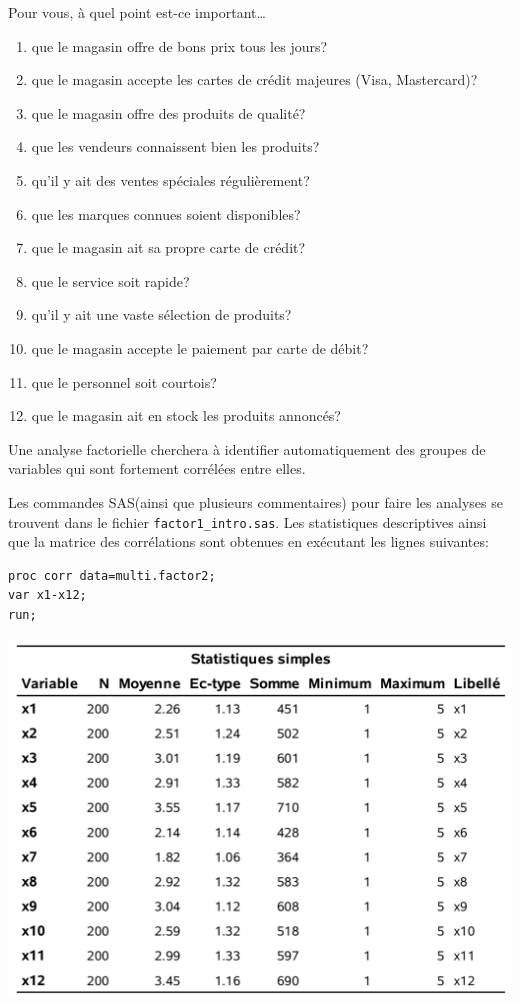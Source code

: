 \documentclass[
]{book}
\providecommand{\tightlist}{%
  \setlength{\itemsep}{0pt}\setlength{\parskip}{0pt}}
\theoremstyle{definition}
\theoremstyle{definition}
\theoremstyle{definition}
\theoremstyle{remark}
\begin{document}
Pour vous, à quel point est-ce important\ldots

\begin{enumerate}
\def\labelenumi{\arabic{enumi}.}
\tightlist
\item
  que le magasin offre de bons prix tous les jours?
\item
  que le magasin accepte les cartes de crédit majeures (Visa, Mastercard)?
\item
  que le magasin offre des produits de qualité?
\item
  que les vendeurs connaissent bien les produits?
\item
  qu'il y ait des ventes spéciales régulièrement?
\item
  que les marques connues soient disponibles?
\item
  que le magasin ait sa propre carte de crédit?
\item
  que le service soit rapide?
\item
  qu'il y ait une vaste sélection de produits?
\item
  que le magasin accepte le paiement par carte de débit?
\item
  que le personnel soit courtois?
\item
  que le magasin ait en stock les produits annoncés?
\end{enumerate}

Une analyse factorielle cherchera à identifier automatiquement des groupes de variables qui sont fortement corrélées entre elles.

Les commandes \textsf{SAS}(ainsi que plusieurs commentaires) pour faire les analyses se trouvent dans le fichier \texttt{factor1\_intro.sas}. Les statistiques descriptives ainsi que la matrice des corrélations sont obtenues en exécutant les lignes suivantes:

\begin{verbatim}
proc corr data=multi.factor2;
var x1-x12;
run;
\end{verbatim}

\begin{center}\includegraphics[width=0.9\linewidth]{figures/01-facto-e1} \end{center}
\end{document}
